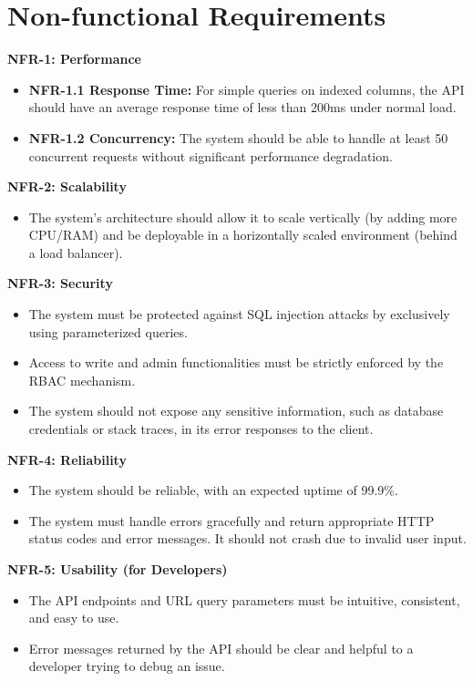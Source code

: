 \documentclass[12pt, a4paper]{report}
\begin{document}
\section{Non-functional Requirements}

\noindent\textbf{NFR-1: Performance}
\begin{itemize}
    \item \textbf{NFR-1.1 Response Time:} For simple queries on indexed columns, the API should have an average response time of less than 200ms under normal load.
    \item \textbf{NFR-1.2 Concurrency:} The system should be able to handle at least 50 concurrent requests without significant performance degradation.
\end{itemize}

\noindent\textbf{NFR-2: Scalability}
\begin{itemize}
    \item The system's architecture should allow it to scale vertically (by adding more CPU/RAM) and be deployable in a horizontally scaled environment (behind a load balancer).
\end{itemize}

\noindent\textbf{NFR-3: Security}
\begin{itemize}
    \item The system must be protected against SQL injection attacks by exclusively using parameterized queries.
    \item Access to write and admin functionalities must be strictly enforced by the RBAC mechanism.
    \item The system should not expose any sensitive information, such as database credentials or stack traces, in its error responses to the client.
\end{itemize}

\noindent\textbf{NFR-4: Reliability}
\begin{itemize}
    \item The system should be reliable, with an expected uptime of 99.9\%.
    \item The system must handle errors gracefully and return appropriate HTTP status codes and error messages. It should not crash due to invalid user input.
\end{itemize}

\noindent\textbf{NFR-5: Usability (for Developers)}
\begin{itemize}
    \item The API endpoints and URL query parameters must be intuitive, consistent, and easy to use.
    \item Error messages returned by the API should be clear and helpful to a developer trying to debug an issue.
\end{itemize}
\end{document}
